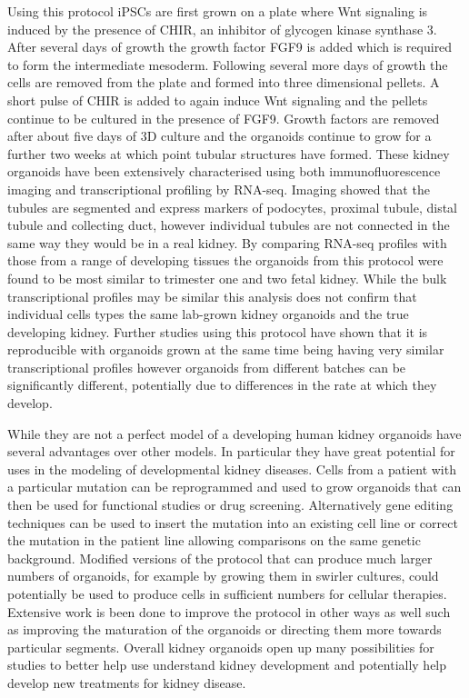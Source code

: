 \documentclass[11pt,a4paper,titlepage,twoside,openright]{style/unimelbthesis}
\theoremstyle{definition}
\theoremstyle{definition}
\theoremstyle{definition}
\theoremstyle{remark}
\begin{document}
\begin{mainmatter}
Using this protocol iPSCs are first grown on a plate where Wnt signaling is induced by the presence of CHIR, an inhibitor of glycogen kinase synthase 3. After several days of growth the growth factor FGF9 is added which is required to form the intermediate mesoderm. Following several more days of growth the cells are removed from the plate and formed into three dimensional pellets. A short pulse of CHIR is added to again induce Wnt signaling and the pellets continue to be cultured in the presence of FGF9. Growth factors are removed after about five days of 3D culture and the organoids continue to grow for a further two weeks at which point tubular structures have formed. These kidney organoids have been extensively characterised using both immunofluorescence imaging and transcriptional profiling by RNA-seq. Imaging showed that the tubules are segmented and express markers of podocytes, proximal tubule, distal tubule and collecting duct, however individual tubules are not connected in the same way they would be in a real kidney. By comparing RNA-seq profiles with those from a range of developing tissues the organoids from this protocol were found to be most similar to trimester one and two fetal kidney. While the bulk transcriptional profiles may be similar this analysis does not confirm that individual cells types the same lab-grown kidney organoids and the true developing kidney. Further studies using this protocol have shown that it is reproducible with organoids grown at the same time being having very similar transcriptional profiles however organoids from different batches can be significantly different, potentially due to differences in the rate at which they develop.

While they are not a perfect model of a developing human kidney organoids have several advantages over other models. In particular they have great potential for uses in the modeling of developmental kidney diseases. Cells from a patient with a particular mutation can be reprogrammed and used to grow organoids that can then be used for functional studies or drug screening. Alternatively gene editing techniques can be used to insert the mutation into an existing cell line or correct the mutation in the patient line allowing comparisons on the same genetic background. Modified versions of the protocol that can produce much larger numbers of organoids, for example by growing them in swirler cultures, could potentially be used to produce cells in sufficient numbers for cellular therapies. Extensive work is been done to improve the protocol in other ways as well such as improving the maturation of the organoids or directing them more towards particular segments. Overall kidney organoids open up many possibilities for studies to better help use understand kidney development and potentially help develop new treatments for kidney disease.


\end{mainmatter}
\end{document}
